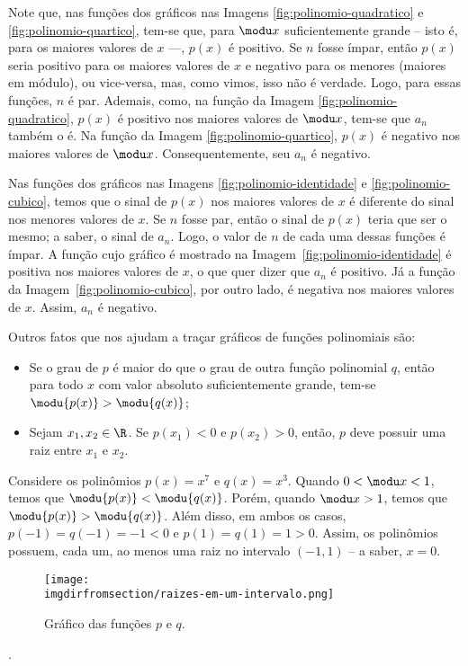 \begin{solution}
  Note que, nas funções dos gráficos nas Imagens \ref{fig:polinomio-quadratico} e \ref{fig:polinomio-quartico},
  tem-se que, para $\modu x$ suficientemente grande -- isto é, para os maiores valores de $x$ ---, 
  $p(x)$ é positivo. 
  Se $n$ fosse ímpar, então $p(x)$ seria positivo para os maiores valores de $x$ e negativo para os menores (maiores
  em módulo), ou vice-versa, mas, como vimos, isso não é verdade. 
  Logo, para essas funções, $n$ é par. 
  Ademais, como, na função da Imagem \ref{fig:polinomio-quadratico}, $p(x)$ é positivo nos maiores valores de $\modu x$, 
  tem-se que $a_n$ também o é. Na função da Imagem \ref{fig:polinomio-quartico}, $p(x)$ é negativo nos maiores
  valores de $\modu x$. Consequentemente, seu $a_n$ é negativo.

  Nas funções dos gráficos nas Imagens \ref{fig:polinomio-identidade} e \ref{fig:polinomio-cubico}, temos que o 
  sinal de $p(x)$ nos maiores valores de $x$ é diferente do sinal nos menores valores de $x$.
  Se $n$ fosse par, então o sinal de $p(x)$ teria que ser o mesmo; a saber, o sinal de $a_n$.
  Logo, o valor de $n$ de cada uma dessas funções é ímpar.  
  A função cujo gráfico é mostrado na Imagem~\ref{fig:polinomio-identidade} é positiva nos maiores valores de $x$,
  o que quer dizer que $a_n$ é positivo. 
  Já a função da Imagem~\ref{fig:polinomio-cubico}, por outro lado, é negativa nos maiores valores de $x$.
  Assim, $a_n$ é negativo.
\end{solution}


Outros fatos que nos ajudam a traçar gráficos de funções polinomiais são:
%
\begin{itemize}
\item Se o grau de $p$ é maior do que o grau de outra função polinomial $q$, 
então para todo $x$ com valor absoluto suficientemente grande, 
tem-se $\modu {p(x)} > \modu{q(x)}$;
\item Sejam $x_1, x_2 \in \R$. Se $p(x_1) < 0$ e $p(x_2)>0$,
então, $p$ deve possuir uma raiz entre $x_1$ e $x_2$.
\end{itemize}

\begin{example}
Considere os polinômios $p(x) = x^7 $ e $q(x)=x^3$. 
Quando $0< \modu x < 1$, temos que $\modu {p(x)} < \modu{q(x)}$. 
Porém, quando $ \modu x > 1$, temos que $\modu {p(x)} > \modu{q(x)}$. 
Além disso, em ambos os casos, $p(-1) = q(-1) = -1 <0$ e $p(1) = q(1) = 1 >0$.
Assim, os polinômios possuem, cada um, ao menos uma raiz no
intervalo $(-1, 1)$ -- a saber, $x=0$.
\end{example}

\begin{figure}[H]
  \centering\texttt{[image: \\imgdirfromsection/raizes-em-um-intervalo.png]}
  \caption{Gráfico das funções $p$ e $q$.}
  \label{fig:raizes-em-um-intervalo}
\end{figure}

\begin{onlineact}
	.
\end{onlineact}